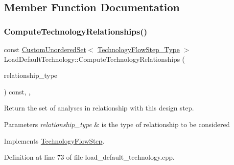 \subsection{Member Function Documentation}
\mbox{\label{classLoadDefaultTechnology_a7c86cdd7c8b95b248a7bca14cc1d81f3}} 
\subsubsection{\texorpdfstring{Compute\+Technology\+Relationships()}{ComputeTechnologyRelationships()}}
{\footnotesize\ttfamily const \hyperlink{classCustomUnorderedSet}{Custom\+Unordered\+Set}$<$ \hyperlink{technology__flow__step_8hpp_a65208cfec963a7d7def292f9db428292}{Technology\+Flow\+Step\+\_\+\+Type} $>$ Load\+Default\+Technology\+::\+Compute\+Technology\+Relationships (\begin{DoxyParamCaption}\item[{const \hyperlink{classDesignFlowStep_a723a3baf19ff2ceb77bc13e099d0b1b7}{Design\+Flow\+Step\+::\+Relationship\+Type}}]{relationship\+\_\+type }\end{DoxyParamCaption}) const\hspace{0.3cm}{\ttfamily [override]}, {\ttfamily [protected]}, {\ttfamily [virtual]}}



Return the set of analyses in relationship with this design step. 


\begin{DoxyParams}{Parameters}
{\em relationship\+\_\+type} & is the type of relationship to be considered \\
\hline
\end{DoxyParams}


Implements \hyperlink{classTechnologyFlowStep_ab543169c9b0143c8ae8831d765519075}{Technology\+Flow\+Step}.



Definition at line 73 of file load\+\_\+default\+\_\+technology.\+cpp.

\mbox{\label{classLoadDefaultTechnology_ad3943a87c0ecb17d3823a40c4e959df6}} 
